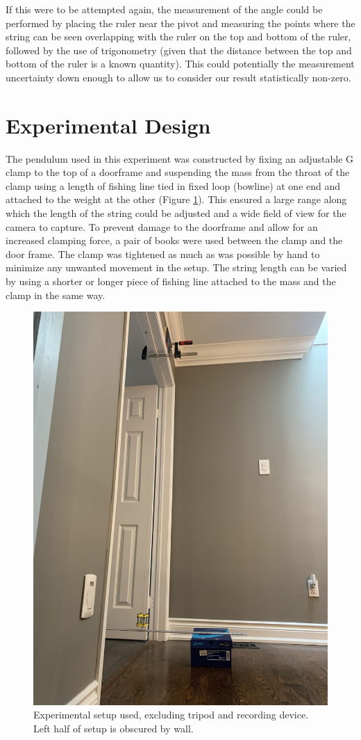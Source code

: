 \documentclass[11pt]{article}
\begin{document}
        If this were to be attempted again, the measurement of the angle could be performed by placing the ruler near the pivot and measuring the points where the string can be seen overlapping with the ruler on the top and bottom of the ruler, followed by the use of trigonometry (given that the distance between the top and bottom of the ruler is a known quantity). This could potentially the measurement uncertainty down enough to allow us to consider our result statistically non-zero.

    \section{Experimental Design}\label{design}
        The pendulum used in this experiment was constructed by fixing an adjustable G clamp to the top of a doorframe and suspending the mass from the throat of the clamp using a length of fishing line tied in fixed loop (bowline) at one end and attached to the weight at the other (Figure \ref{fig:setup}). This ensured a large range along which the length of the string could be adjusted and a wide field of view for the camera to capture. To prevent damage to the doorframe and allow for an increased clamping force, a pair of books were used between the clamp and the door frame. The clamp was tightened as much as was possible by hand to minimize any unwanted movement in the setup. The string length can be varied by using a shorter or longer piece of fishing line attached to the mass and the clamp in the same way. 

        \begin{figure}[H]
            \centering\includegraphics[width=.7\linewidth]{setup.jpg}
            \caption{Experimental setup used, excluding tripod and recording device. Left half of setup is obscured by wall.}
            \label{fig:setup}
        \end{figure}
        
\end{document}

